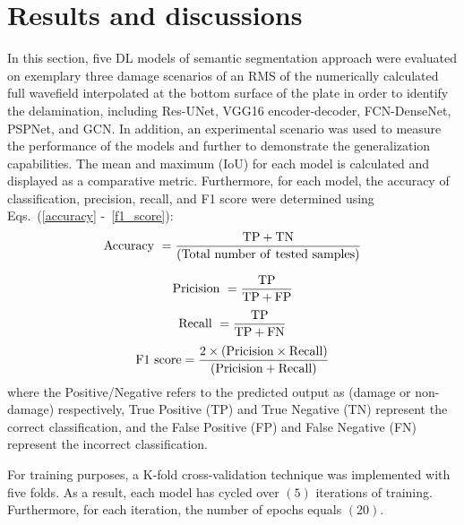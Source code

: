\section{Results and discussions}
\label{section:results_and_discussions}
In this section, five DL models of semantic segmentation approach were evaluated on exemplary three damage scenarios of an RMS of the numerically calculated full wavefield interpolated at the bottom surface of the plate in order to identify the delamination, including Res-UNet, VGG16 encoder-decoder, FCN-DenseNet, PSPNet, and GCN.
In addition, an experimental scenario was used to measure the performance of the models and further to demonstrate the generalization capabilities.
The mean and maximum (IoU) for each model is calculated and displayed as a comparative metric.
Furthermore, for each model, the accuracy of classification, precision, recall, and F1 score were determined using Eqs.~(\ref{accuracy} -~\ref{f1_score}):
\begin{equation}
	\rm Accuracy\ = \frac{TP+TN}{(Total\ number\ of\ tested\ samples)}
	\label{accuracy}
\end{equation}

\begin{equation}
	\rm Pricision\ =\frac{TP}{TP+FP}
	\label{pricisoin}
\end{equation}
\begin{equation}
	\rm Recall\ = \frac{TP}{TP+ FN}
	\label{recall}
\end{equation}
\begin{equation}
	\rm F1\ score =\frac{2 \times (Pricision\times Recall)}{(Pricision + Recall)} 
	\label{f1_score}
\end{equation}
where the Positive/Negative refers to the predicted output as (damage or non-damage) respectively, True Positive (TP) and True Negative (TN) represent the correct classification, and the False Positive (FP) and False Negative (FN) represent the incorrect classification.

For training purposes, a K-fold cross-validation technique was implemented with five folds.
As a result, each model has cycled over \((5)\) iterations of training.
Furthermore, for each iteration, the number of epochs equals \((20)\).
